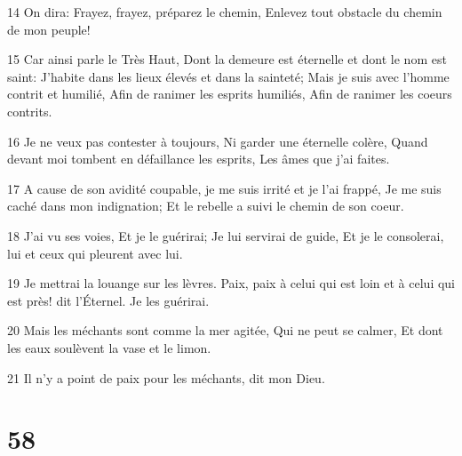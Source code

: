 \par 14 On dira: Frayez, frayez, préparez le chemin, Enlevez tout obstacle du chemin de mon peuple!
\par 15 Car ainsi parle le Très Haut, Dont la demeure est éternelle et dont le nom est saint: J'habite dans les lieux élevés et dans la sainteté; Mais je suis avec l'homme contrit et humilié, Afin de ranimer les esprits humiliés, Afin de ranimer les coeurs contrits.
\par 16 Je ne veux pas contester à toujours, Ni garder une éternelle colère, Quand devant moi tombent en défaillance les esprits, Les âmes que j'ai faites.
\par 17 A cause de son avidité coupable, je me suis irrité et je l'ai frappé, Je me suis caché dans mon indignation; Et le rebelle a suivi le chemin de son coeur.
\par 18 J'ai vu ses voies, Et je le guérirai; Je lui servirai de guide, Et je le consolerai, lui et ceux qui pleurent avec lui.
\par 19 Je mettrai la louange sur les lèvres. Paix, paix à celui qui est loin et à celui qui est près! dit l'Éternel. Je les guérirai.
\par 20 Mais les méchants sont comme la mer agitée, Qui ne peut se calmer, Et dont les eaux soulèvent la vase et le limon.
\par 21 Il n'y a point de paix pour les méchants, dit mon Dieu.

\chapter{58}

